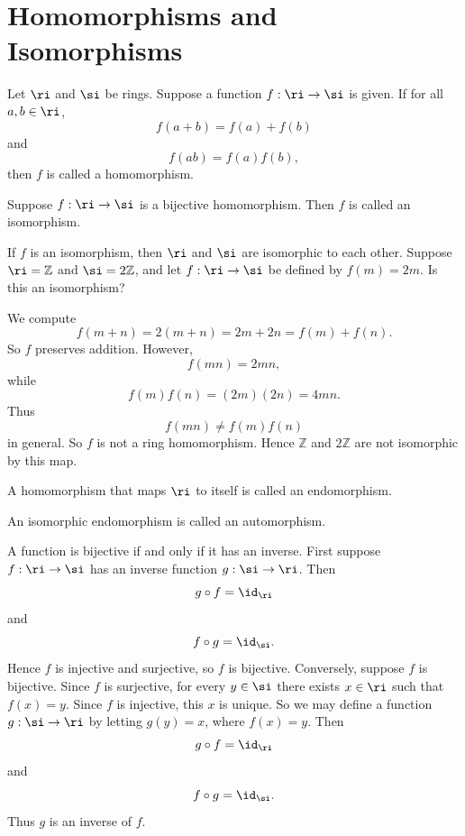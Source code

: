 
\section{Homomorphisms and Isomorphisms}

\begin{definition}[Homomorphism]
    Let $\ri$ and $\si$ be rings.
    Suppose a function $f:\ri\to\si$ is given.
    If for all $a,b\in\ri$,
    \[
        f(a+b)=f(a)+f(b)
    \]
    and
    \[
        f(ab)=f(a)f(b),
    \]
    then $f$ is called a homomorphism.
\end{definition}

\begin{definition}[Isomorphism]
    Suppose $f:\ri\to\si$ is a bijective homomorphism.
    Then $f$ is called an isomorphism.
\end{definition}

If $f$ is an isomorphism, then $\ri$ and $\si$ are isomorphic to each other.
Suppose $\ri=\mathbb{Z}$ and $\si=2\mathbb{Z}$, and let $f:\ri\to\si$ be defined by $f(m)=2m$.
Is this an isomorphism?

\begin{example}
    We compute
    \[
        f(m+n)=2(m+n)=2m+2n=f(m)+f(n).
    \]
    So $f$ preserves addition.
    However,
    \[
        f(mn)=2mn,
    \]
    while
    \[
        f(m)f(n)=(2m)(2n)=4mn.
    \]
    Thus
    \[
        f(mn)\neq f(m)f(n)
    \]
    in general.
    So $f$ is not a ring homomorphism.
    Hence $\mathbb{Z}$ and $2\mathbb{Z}$ are not isomorphic by this map.
\end{example}

\begin{definition}[Endomorphism]
    A homomorphism that maps $\ri$ to itself is called an endomorphism.
\end{definition}

\begin{definition}[Automorphism]
    An isomorphic endomorphism is called an automorphism.
\end{definition}

\begin{proposition}{
    A function is bijective if and only if it has an inverse.
}
    First suppose $f:\ri\to\si$ has an inverse function $g:\si\to\ri$.
    Then
    \[
        g\circ f=\id_{\ri}
    \]
    and
    \[
        f\circ g=\id_{\si}.
    \]
    Hence $f$ is injective and surjective, so $f$ is bijective.
    Conversely, suppose $f$ is bijective.
    Since $f$ is surjective, for every $y\in\si$ there exists $x\in\ri$ such that $f(x)=y$.
    Since $f$ is injective, this $x$ is unique.
    So we may define a function $g:\si\to\ri$ by letting $g(y)=x$, where $f(x)=y$.
    Then
    \[
        g\circ f=\id_{\ri}
    \]
    and
    \[
        f\circ g=\id_{\si}.
    \]
    Thus $g$ is an inverse of $f$.
\end{proposition}

